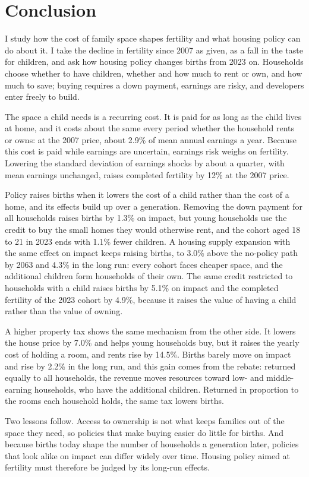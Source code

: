 \section{Conclusion}
\label{sec:conclusion}

I study how the cost of family space shapes fertility and what housing
policy can do about it. I take the decline in fertility since 2007 as given,
as a fall in the taste for children, and ask how housing policy changes
births from 2023 on. Households choose whether to have children, whether and
how much to rent or own, and how much to save; buying requires a down
payment, earnings are risky, and developers enter freely to build.

The space a child needs is a recurring cost. It is paid for as long as the
child lives at home, and it costs about the same every period whether the
household rents or owns: at the 2007 price, about 2.9\% of mean annual
earnings a year. Because this cost is paid while earnings are uncertain,
earnings risk weighs on fertility. Lowering the standard deviation of
earnings shocks by about a quarter, with mean earnings unchanged, raises
completed fertility by 12\% at the 2007 price.

Policy raises births when it lowers the cost of a child rather than the cost
of a home, and its effects build up over a generation. Removing the down
payment for all households raises births by 1.3\% on impact, but young
households use the credit to buy the small homes they would otherwise rent,
and the cohort aged 18 to 21 in 2023 ends with 1.1\% fewer children. A
housing supply expansion with the same effect on impact keeps raising
births, to 3.0\% above the no-policy path by 2063 and 4.3\% in the long run:
every cohort faces cheaper space, and the additional children form
households of their own. The same credit restricted to households with a
child raises births by 5.1\% on impact and the completed fertility of the
2023 cohort by 4.9\%, because it raises the value of having a child rather
than the value of owning.

A higher property tax shows the same mechanism from the other side. It
lowers the house price by 7.0\% and helps young households buy, but it
raises the yearly cost of holding a room, and rents rise by 14.5\%. Births
barely move on impact and rise by 2.2\% in the long run, and this gain comes
from the rebate: returned equally to all households, the revenue moves
resources toward low- and middle-earning households, who have the additional
children. Returned in proportion to the rooms each household holds, the same
tax lowers births.

Two lessons follow. Access to ownership is not what keeps families out of the
space they need, so policies that make buying easier do little for births.
And because births today shape the number of households a generation later,
policies that look alike on impact can differ widely over time. Housing
policy aimed at fertility must therefore be judged by its long-run effects.
